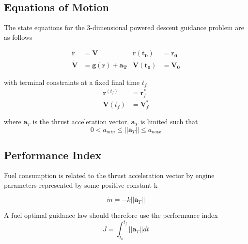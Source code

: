 \subsection{Equations of Motion}
The state equations for the 3-dimensional powered descent guidance problem are as follows

\begin{align}
\label{eqn:EoM1}
\boldsymbol{\dot{r}} &= \boldsymbol{V}                               & \boldsymbol{r(t_0)} &= \boldsymbol{r_0}\\
\label{eqn:EoM2}
\boldsymbol{\dot{V}} &= \boldsymbol{g(r)} + \boldsymbol{a_T}                           & \boldsymbol{V(t_0)} &= \boldsymbol{V_0}
\end{align}


with terminal constraints at a fixed final time $t_f$
\begin{align}
\label{eqn:constraint_r}
\boldsymbol{r}^(t_f) &= \boldsymbol{r}^*_f\\
\label{eqn:constraint_V}
\boldsymbol{V}(t_f) &= \boldsymbol{V}^*_f 
\end{align}

where $\boldsymbol{a}_T$ is the thrust acceleration vector. $\boldsymbol{a}_T$ is limited such that
\begin{equation} 
\label{eqn:thrustlimit}
0 < a_{min} \leq ||\boldsymbol{a}_T|| \leq a_{max}
\end{equation}

\subsection{Performance Index}
Fuel consumption is related to the thrust acceleration vector by engine parameters represented by some positive constant k

\begin{equation}
\label{eqn:fuel_rate}
\dot{m} = -k ||\boldsymbol{a}_T||
\end{equation}

A fuel optimal guidance law should therefore use the performance index
\begin{equation}
\label{eqn:fueloptimalindex}
J = \int_{t_0}^{t_f} ||\boldsymbol{a}_T||dt
\end{equation}

